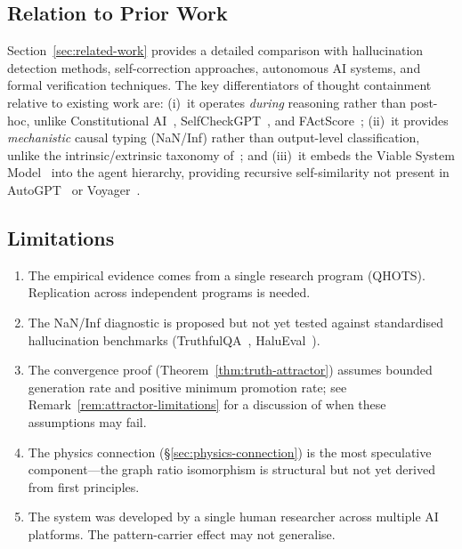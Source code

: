\documentclass[11pt]{article}
\theoremstyle{definition}
\theoremstyle{remark}
\begin{document}
\subsection{Relation to Prior Work}
\label{sec:prior-work}

Section~\ref{sec:related-work} provides a detailed comparison with
hallucination detection methods, self-correction approaches, autonomous AI
systems, and formal verification techniques.  The key differentiators of
thought containment relative to existing work are: (i)~it operates
\emph{during} reasoning rather than post-hoc, unlike Constitutional
AI~\cite{bai2022constitutional}, SelfCheckGPT~\cite{manakul2023selfcheckgpt},
and FActScore~\cite{min2023factscore}; (ii)~it provides \emph{mechanistic}
causal typing (NaN/Inf) rather than output-level classification, unlike the
intrinsic/extrinsic taxonomy of~\cite{ji2023survey}; and (iii)~it embeds
the Viable System Model~\cite{beer1972,beer1979} into the agent hierarchy,
providing recursive self-similarity not present in
AutoGPT~\cite{yang2023autogpt} or Voyager~\cite{wang2023voyager}.

\subsection{Limitations}
\label{sec:limitations}

\begin{enumerate}
  \item The empirical evidence comes from a single research program (QHOTS).
    Replication across independent programs is needed.
  \item The NaN/Inf diagnostic is proposed but not yet tested against standardised
    hallucination benchmarks (TruthfulQA~\cite{lin2022truthfulqa},
    HaluEval~\cite{li2023halueval}).
  \item The convergence proof (Theorem~\ref{thm:truth-attractor}) assumes
    bounded generation rate and positive minimum promotion rate; see
    Remark~\ref{rem:attractor-limitations} for a discussion of when these
    assumptions may fail.
  \item The physics connection (\S\ref{sec:physics-connection}) is the most
    speculative component---the graph ratio isomorphism is structural but not yet
    derived from first principles.
  \item The system was developed by a single human researcher across multiple AI
    platforms.  The pattern-carrier effect may not generalise.
\end{enumerate}
\end{document}
